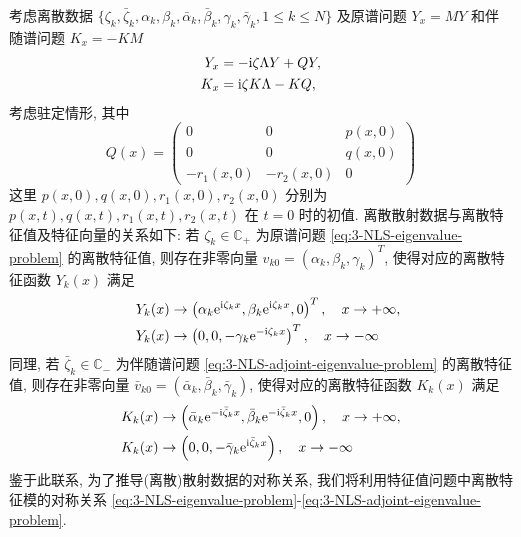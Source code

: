 考虑离散数据 $ \{\zeta_{k}, \bar{\zeta}_{k}, \alpha_{k}, \beta_{k}, \bar{\alpha}_{k}, \bar{\beta}_{k}, \gamma_{k}, \bar{\gamma}_{k}, 1 \leq k \leq N\} $ 及原谱问题 $Y_{x} = MY$ 和伴随谱问题 $K_{x} = -KM $
\begin{align}
    Y_{x} & = - \mathrm{i} \zeta \Lambda Y + Q Y \label{eq:3-NLS-eigenvalue-problem},       \\
    K_{x} & = \mathrm{i} \zeta K \Lambda - K Q \label{eq:3-NLS-adjoint-eigenvalue-problem},
\end{align}
考虑驻定情形, 其中
\begin{equation}
    Q(x)=\begin{pmatrix}
        0           & 0           & p(x,0) \\
        0           & 0           & q(x,0) \\
        -r_{1}(x,0) & -r_{2}(x,0) & 0
    \end{pmatrix}
\end{equation}
这里 $ p(x,0), q(x,0), r_{1}(x,0), r_{2}(x,0) $ 分别为 $ p(x,t), q(x,t), r_{1}(x,t), r_{2}(x,t) $ 在 $ t=0 $ 时的初值. 离散散射数据与离散特征值及特征向量的关系如下: 若 $ \zeta_{k} \in \mathbb{C}_{+} $ 为原谱问题 \eqref{eq:3-NLS-eigenvalue-problem} 的离散特征值, 则存在非零向量 $ v_{k0} = (\alpha_{k}, \beta_{k}, \gamma_{k})^{T} $, 使得对应的离散特征函数 $ Y_{k}(x) $ 满足
\begin{align}
    Y_{k}(x) & \to \left(\alpha_{k} \mathrm{e}^{\mathrm{i} \zeta_{k} x}, \beta_{k} \mathrm{e}^{\mathrm{i} \zeta_{k} x}, 0\right)^T, \quad x \to + \infty,                                  \\
    \quad
    Y_{k}(x) & \to \left(0, 0, -\gamma_{k} \mathrm{e}^{-\mathrm{i} \zeta_{k} x}\right)^T, \quad x \to -\infty \label{eq:large-x-asymptotics-of-reverse-x-3d-NLS-eigenfunction}
\end{align}
同理, 若 $ \bar{\zeta}_{k} \in \mathbb{C}_{-} $ 为伴随谱问题 \eqref{eq:3-NLS-adjoint-eigenvalue-problem} 的离散特征值, 则存在非零向量 $ \bar{v}_{k0} = (\bar{\alpha}_{k}, \bar{\beta}_{k}, \bar{\gamma}_{k}) $, 使得对应的离散特征函数 $ K_{k}(x) $ 满足
\begin{align}
    K_{k}(x) & \to \left(\bar{\alpha}_{k} \mathrm{e}^{-\mathrm{i} \bar{\zeta}_{k} x},\bar{\beta}_{k} \mathrm{e}^{-\mathrm{i} \bar{\zeta}_{k} x}, 0\right), \quad x \to +\infty, \\
    K_{k}(x) & \to \left(0, 0, -\bar{\gamma}_{k}\mathrm{e}^{\mathrm{i} \bar{\zeta}_{k}x}\right), \quad x \to -\infty
    \label{eq:large-x-asymptotics-of-reverse-x-3d-NLS-adjoint-eigenfunction}
\end{align}
鉴于此联系, 为了推导(离散)散射数据的对称关系, 我们将利用特征值问题中离散特征模的对称关系 \eqref{eq:3-NLS-eigenvalue-problem}-\eqref{eq:3-NLS-adjoint-eigenvalue-problem}.
